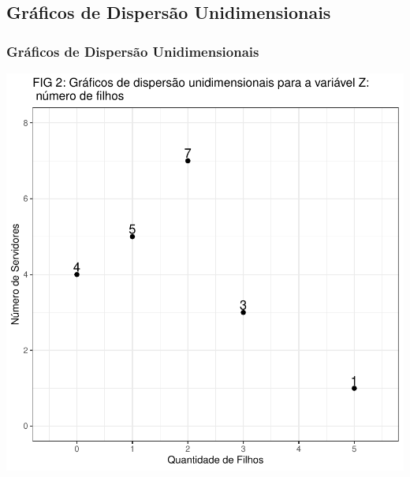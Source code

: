 \documentclass[14pt,aspectratio=1610]{beamer}
\begin{document}
\subsection{Gráficos de Dispersão Unidimensionais}
\begin{frame}{}
\frametitle{Gráficos de Dispersão Unidimensionais}
\begin{block}{}
\begin{center}
\includegraphics{Aula5-point1}
\end{center}
\end{block}
\end{frame}
\end{document}
